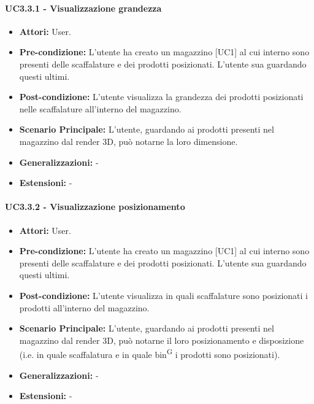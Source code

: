 \paragraph{UC3.3.1 - Visualizzazione grandezza}
\begin{itemize}
    \item \textbf{Attori:} User.
    \item \textbf{Pre-condizione:} L'utente ha creato un magazzino [UC1] al cui interno sono presenti delle scaffalature e dei prodotti posizionati. L'utente sua guardando questi ultimi.
    \item \textbf{Post-condizione:} L'utente visualizza la grandezza dei prodotti posizionati nelle scaffalature all'interno del magazzino.
    \item \textbf{Scenario Principale:} L'utente, guardando ai prodotti presenti nel magazzino dal render 3D, può notarne la loro dimensione.
    \item \textbf{Generalizzazioni:} -
    \item \textbf{Estensioni:} -
\end{itemize}


\paragraph{UC3.3.2 - Visualizzazione posizionamento}
\begin{itemize}
    \item \textbf{Attori:} User.
    \item \textbf{Pre-condizione:} L'utente ha creato un magazzino [UC1] al cui interno sono presenti delle scaffalature e dei prodotti posizionati. L'utente sua guardando questi ultimi.
    \item \textbf{Post-condizione:} L'utente visualizza in quali scaffalature sono posizionati i prodotti all'interno del magazzino.
    \item \textbf{Scenario Principale:}  L'utente, guardando ai prodotti presenti nel magazzino dal render 3D, può notarne il loro posizionamento e disposizione (i.e. in quale scaffalatura e in quale bin\textsuperscript{G} i prodotti sono posizionati).
    \item \textbf{Generalizzazioni:} -
    \item \textbf{Estensioni:} -
\end{itemize}